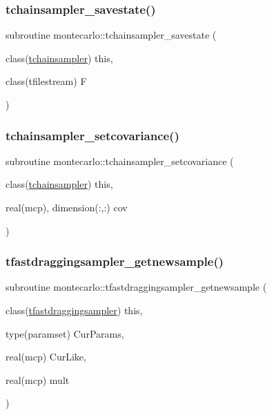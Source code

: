 \subsubsection{\texorpdfstring{tchainsampler\+\_\+savestate()}{tchainsampler\_savestate()}}
{\footnotesize\ttfamily subroutine montecarlo\+::tchainsampler\+\_\+savestate (\begin{DoxyParamCaption}\item[{class(\mbox{\hyperlink{structmontecarlo_1_1tchainsampler}{tchainsampler}})}]{this,  }\item[{class(tfilestream)}]{F }\end{DoxyParamCaption})\hspace{0.3cm}{\ttfamily [private]}}

\mbox{\label{namespacemontecarlo_aac962ce86a301904d17d4fad89a3f188}} 
\subsubsection{\texorpdfstring{tchainsampler\+\_\+setcovariance()}{tchainsampler\_setcovariance()}}
{\footnotesize\ttfamily subroutine montecarlo\+::tchainsampler\+\_\+setcovariance (\begin{DoxyParamCaption}\item[{class(\mbox{\hyperlink{structmontecarlo_1_1tchainsampler}{tchainsampler}})}]{this,  }\item[{real(mcp), dimension(\+:,\+:)}]{cov }\end{DoxyParamCaption})\hspace{0.3cm}{\ttfamily [private]}}

\mbox{\label{namespacemontecarlo_aabc2865a5460edaf007be6dca34d3eca}} 
\subsubsection{\texorpdfstring{tfastdraggingsampler\+\_\+getnewsample()}{tfastdraggingsampler\_getnewsample()}}
{\footnotesize\ttfamily subroutine montecarlo\+::tfastdraggingsampler\+\_\+getnewsample (\begin{DoxyParamCaption}\item[{class(\mbox{\hyperlink{structmontecarlo_1_1tfastdraggingsampler}{tfastdraggingsampler}})}]{this,  }\item[{type(paramset)}]{Cur\+Params,  }\item[{real(mcp)}]{Cur\+Like,  }\item[{real(mcp)}]{mult }\end{DoxyParamCaption})\hspace{0.3cm}{\ttfamily [private]}}

